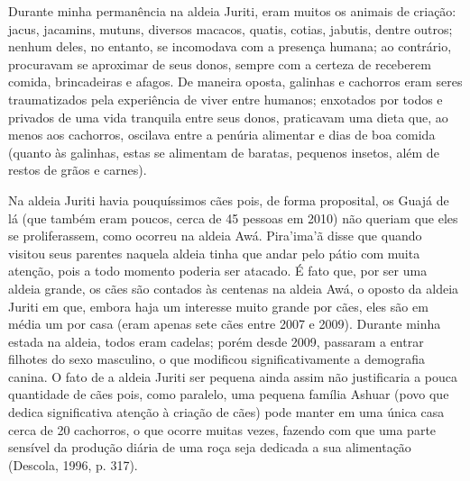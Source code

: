 Durante minha permanência na aldeia Juriti, eram muitos os animais de
criação: jacus, jacamins, mutuns, diversos macacos, quatis, cotias,
jabutis, dentre outros; nenhum deles, no entanto, se incomodava com a
presença humana; ao contrário, procuravam se aproximar de seus donos,
sempre com a certeza de receberem comida, brincadeiras e afagos. De
maneira oposta, galinhas e cachorros eram seres traumatizados pela
experiência de viver entre humanos; enxotados por todos e privados de
uma vida tranquila entre seus donos, praticavam uma dieta que, ao menos
aos cachorros, oscilava entre a penúria alimentar e dias de boa comida
(quanto às galinhas, estas se alimentam de baratas, pequenos insetos,
além de restos de grãos e carnes).

Na aldeia Juriti havia pouquíssimos cães pois, de forma proposital, os
Guajá de lá (que também eram poucos, cerca de 45 pessoas em 2010) não
queriam que eles se proliferassem, como ocorreu na aldeia Awá.
Pira'ima'ã disse que quando visitou seus parentes naquela aldeia tinha
que andar pelo pátio com muita atenção, pois a todo momento poderia ser
atacado. É fato que, por ser uma aldeia grande, os cães são contados às
centenas na aldeia Awá, o oposto da aldeia Juriti em que, embora
haja um interesse muito grande por cães, eles são em média um por casa
(eram apenas sete cães entre 2007 e 2009). Durante minha estada na
aldeia, todos eram cadelas; porém desde 2009, passaram a entrar filhotes
do sexo masculino, o que modificou significativamente a demografia
canina. O fato de a aldeia Juriti ser pequena ainda assim não
justificaria a pouca quantidade de cães pois, como paralelo, uma pequena
família Ashuar (povo que dedica significativa atenção à criação de cães)
pode manter em uma única casa cerca de 20 cachorros, o que ocorre muitas
vezes, fazendo com que uma parte sensível da produção diária de uma roça
seja dedicada a sua alimentação (Descola, 1996, p. 317).

